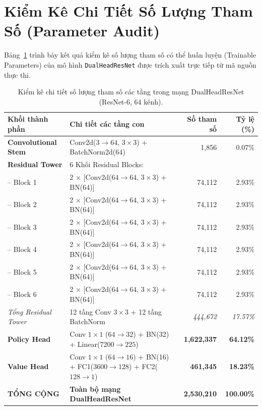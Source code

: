 \documentclass[11pt,a4paper]{report}
\begin{document}
\section{Kiểm Kê Chi Tiết Số Lượng Tham Số (Parameter Audit)}

Bảng~\ref{tab:parameter_audit} trình bày kết quả kiểm kê số lượng tham số có thể huấn luyện (Trainable Parameters) của mô hình \texttt{DualHeadResNet} được trích xuất trực tiếp từ mã nguồn thực thi.

\begin{table}[htbp]
\centering
\caption{Kiểm kê chi tiết số lượng tham số các tầng trong mạng DualHeadResNet (ResNet-6, 64 kênh).}
\label{tab:parameter_audit}
\begin{tabularx}{\textwidth}{p{3.5cm} p{6.5cm} r r}
\toprule
\textbf{Khối thành phần} & \textbf{Chi tiết các tầng con} & \textbf{Số tham số} & \textbf{Tỷ lệ (\%)} \\
\midrule
\textbf{Convolutional Stem} & Conv2d($3 \to 64$, $3\times 3$) + BatchNorm2d(64) & 1,856 & 0.07\% \\
\addlinespace
\textbf{Residual Tower} & 6 Khối Residual Blocks: & & \\
-- Block 1 & 2 $\times$ [Conv2d($64\to 64$, $3\times 3$) + BN(64)] & 74,112 & 2.93\% \\
-- Block 2 & 2 $\times$ [Conv2d($64\to 64$, $3\times 3$) + BN(64)] & 74,112 & 2.93\% \\
-- Block 3 & 2 $\times$ [Conv2d($64\to 64$, $3\times 3$) + BN(64)] & 74,112 & 2.93\% \\
-- Block 4 & 2 $\times$ [Conv2d($64\to 64$, $3\times 3$) + BN(64)] & 74,112 & 2.93\% \\
-- Block 5 & 2 $\times$ [Conv2d($64\to 64$, $3\times 3$) + BN(64)] & 74,112 & 2.93\% \\
-- Block 6 & 2 $\times$ [Conv2d($64\to 64$, $3\times 3$) + BN(64)] & 74,112 & 2.93\% \\
\textit{Tổng Residual Tower} & 12 tầng Conv $3\times 3$ + 12 tầng BatchNorm & \textit{444,672} & \textit{17.57\%} \\
\addlinespace
\textbf{Policy Head} & Conv $1\times 1$ ($64\to 32$) + BN(32) + Linear($7200 \to 225$) & \textbf{1,622,337} & \textbf{64.12\%} \\
\addlinespace
\textbf{Value Head} & Conv $1\times 1$ ($64\to 16$) + BN(16) + FC1($3600\to 128$) + FC2($128\to 1$) & \textbf{461,345} & \textbf{18.23\%} \\
\midrule
\textbf{TỔNG CỘNG} & \textbf{Toàn bộ mạng DualHeadResNet} & \textbf{2,530,210} & \textbf{100.00\%} \\
\bottomrule
\end{tabularx}
\end{table}
\end{document}
